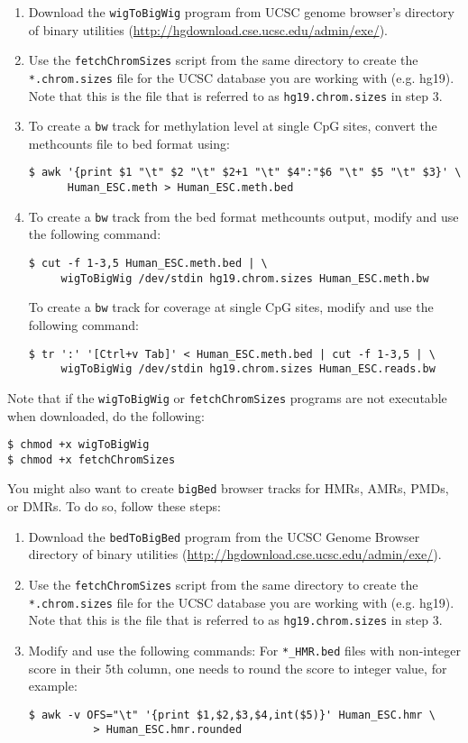 \documentclass[10pt]{article}
\newcommand{\prog}[1]{\texttt{#1}}
\newcommand{\fn}[1]{\texttt{#1}}
\begin{document}
{{\begin{enumerate}
\item Download the \prog{wigToBigWig} program from UCSC genome
  browser's directory of binary utilities
  (\url{http://hgdownload.cse.ucsc.edu/admin/exe/}).
\item Use the \fn{fetchChromSizes} script from the same directory to
  create the \fn{*.chrom.sizes} file for the UCSC database you are
  working with (e.g. hg19). Note that this is the file that is
  referred to as \fn{hg19.chrom.sizes} in step 3.
\item To create a \fn{bw} track for methylation level at single CpG
  sites, convert the methcounts file to bed format using:
\begin{verbatim}
$ awk '{print $1 "\t" $2 "\t" $2+1 "\t" $4":"$6 "\t" $5 "\t" $3}' \
      Human_ESC.meth > Human_ESC.meth.bed
\end{verbatim}
\item To create a \fn{bw} track from the bed format methcounts output, modify and use the following command:
\begin{verbatim}
$ cut -f 1-3,5 Human_ESC.meth.bed | \
     wigToBigWig /dev/stdin hg19.chrom.sizes Human_ESC.meth.bw
\end{verbatim}
  To create a \fn{bw} track for coverage at single CpG sites, modify
  and use the following command:
\begin{verbatim}
$ tr ':' '[Ctrl+v Tab]' < Human_ESC.meth.bed | cut -f 1-3,5 | \
     wigToBigWig /dev/stdin hg19.chrom.sizes Human_ESC.reads.bw
\end{verbatim}
\end{enumerate}
Note that if the \prog{wigToBigWig} or \prog{fetchChromSizes} programs
are not executable when downloaded, do the following:
\begin{verbatim}
$ chmod +x wigToBigWig
$ chmod +x fetchChromSizes
\end{verbatim}

\noindent
You might also want to create \fn{bigBed} browser tracks for HMRs,
AMRs, PMDs, or DMRs. To do so, follow these steps:
\begin{enumerate}
\item Download the \prog{bedToBigBed} program from the UCSC Genome
  Browser directory of binary utilities
  (\url{http://hgdownload.cse.ucsc.edu/admin/exe/}).
\item Use the \fn{fetchChromSizes} script from the same directory to
  create the \fn{*.chrom.sizes} file for the UCSC database you are
  working with (e.g. hg19). Note that this is the file that is
  referred to as \fn{hg19.chrom.sizes} in step 3.
\item Modify and use the following commands: For \fn{*\_HMR.bed} files
  with non-integer score in their 5th column, one needs to round the
  score to integer value, for example:
\begin{verbatim}
$ awk -v OFS="\t" '{print $1,$2,$3,$4,int($5)}' Human_ESC.hmr \
          > Human_ESC.hmr.rounded
\end{verbatim}


\end{enumerate}}}
\end{document}
